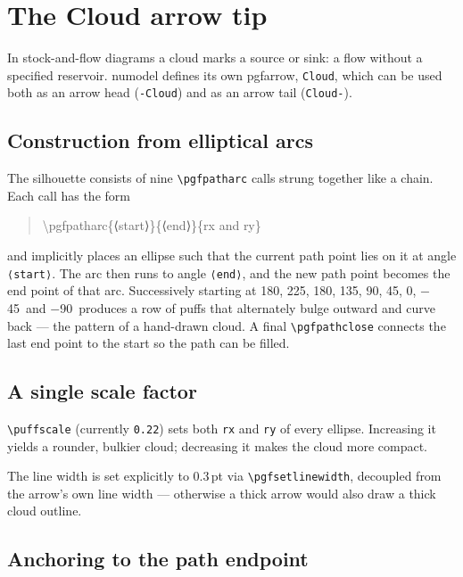 \documentclass[11pt]{article}
\begin{document}
\section*{The Cloud arrow tip}

In stock-and-flow diagrams a cloud marks a source or sink: a
flow without a specified reservoir.  numodel defines its own
pgfarrow, \texttt{Cloud}, which can be used both as an arrow
head (\texttt{-Cloud}) and as an arrow tail (\texttt{Cloud-}).

\subsection*{Construction from elliptical arcs}

The silhouette consists of nine \texttt{\textbackslash pgfpatharc}
calls strung together like a chain.  Each call has the form

\begin{quote}\ttfamily
\textbackslash pgfpatharc\{⟨start⟩\}\{⟨end⟩\}\{rx and ry\}
\end{quote}

and implicitly places an ellipse such that the current path
point lies on it at angle \texttt{⟨start⟩}.  The arc then runs
to angle \texttt{⟨end⟩}, and the new path point becomes the end
point of that arc.  Successively starting at 180\textdegree,
225\textdegree, 180\textdegree, 135\textdegree, 90\textdegree,
45\textdegree, 0\textdegree, $-$45\textdegree\ and
$-$90\textdegree\ produces a row of puffs that alternately bulge
outward and curve back — the pattern of a hand-drawn cloud.  A
final \texttt{\textbackslash pgfpathclose} connects the last end
point to the start so the path can be filled.

\subsection*{A single scale factor}

\texttt{\textbackslash puffscale} (currently \texttt{0.22}) sets
both \texttt{rx} and \texttt{ry} of every ellipse.  Increasing
it yields a rounder, bulkier cloud; decreasing it makes the
cloud more compact.

The line width is set explicitly to 0.3\,pt via
\texttt{\textbackslash pgfsetlinewidth}, decoupled from the
arrow's own line width — otherwise a thick arrow would also
draw a thick cloud outline.

\subsection*{Anchoring to the path endpoint}
\end{document}
